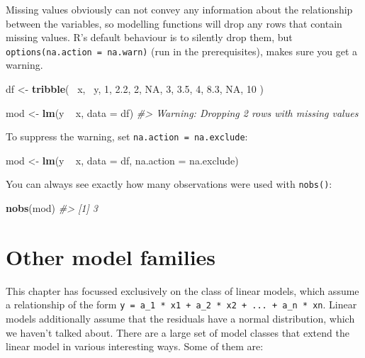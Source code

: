\documentclass[]{book}
\newenvironment{Shaded}{\begin{snugshade}}{\end{snugshade}}
\newcommand{\KeywordTok}[1]{\textcolor[rgb]{0.13,0.29,0.53}{\textbf{{#1}}}}
\newcommand{\DataTypeTok}[1]{\textcolor[rgb]{0.13,0.29,0.53}{{#1}}}
\newcommand{\DecValTok}[1]{\textcolor[rgb]{0.00,0.00,0.81}{{#1}}}
\newcommand{\FloatTok}[1]{\textcolor[rgb]{0.00,0.00,0.81}{{#1}}}
\newcommand{\StringTok}[1]{\textcolor[rgb]{0.31,0.60,0.02}{{#1}}}
\newcommand{\CommentTok}[1]{\textcolor[rgb]{0.56,0.35,0.01}{\textit{{#1}}}}
\newcommand{\OtherTok}[1]{\textcolor[rgb]{0.56,0.35,0.01}{{#1}}}
\newcommand{\NormalTok}[1]{{#1}}
\begin{document}
Missing values obviously can not convey any information about the
relationship between the variables, so modelling functions will drop any
rows that contain missing values. R's default behaviour is to silently
drop them, but \texttt{options(na.action\ =\ na.warn)} (run in the
prerequisites), makes sure you get a warning.

\begin{Shaded}
\begin{Highlighting}[]
\NormalTok{df <-}\StringTok{ }\KeywordTok{tribble}\NormalTok{(}
  \NormalTok{~x, ~y,}
  \DecValTok{1}\NormalTok{, }\FloatTok{2.2}\NormalTok{,}
  \DecValTok{2}\NormalTok{, }\OtherTok{NA}\NormalTok{,}
  \DecValTok{3}\NormalTok{, }\FloatTok{3.5}\NormalTok{,}
  \DecValTok{4}\NormalTok{, }\FloatTok{8.3}\NormalTok{,}
  \OtherTok{NA}\NormalTok{, }\DecValTok{10}
\NormalTok{)}

\NormalTok{mod <-}\StringTok{ }\KeywordTok{lm}\NormalTok{(y ~}\StringTok{ }\NormalTok{x, }\DataTypeTok{data =} \NormalTok{df)}
\CommentTok{#> Warning: Dropping 2 rows with missing values}
\end{Highlighting}
\end{Shaded}

To suppress the warning, set \texttt{na.action\ =\ na.exclude}:

\begin{Shaded}
\begin{Highlighting}[]
\NormalTok{mod <-}\StringTok{ }\KeywordTok{lm}\NormalTok{(y ~}\StringTok{ }\NormalTok{x, }\DataTypeTok{data =} \NormalTok{df, }\DataTypeTok{na.action =} \NormalTok{na.exclude)}
\end{Highlighting}
\end{Shaded}

You can always see exactly how many observations were used with
\texttt{nobs()}:

\begin{Shaded}
\begin{Highlighting}[]
\KeywordTok{nobs}\NormalTok{(mod)}
\CommentTok{#> [1] 3}
\end{Highlighting}
\end{Shaded}

\section{Other model families}\label{other-model-families}

This chapter has focussed exclusively on the class of linear models,
which assume a relationship of the form
\texttt{y\ =\ a\_1\ *\ x1\ +\ a\_2\ *\ x2\ +\ ...\ +\ a\_n\ *\ xn}.
Linear models additionally assume that the residuals have a normal
distribution, which we haven't talked about. There are a large set of
model classes that extend the linear model in various interesting ways.
Some of them are:
\end{document}
